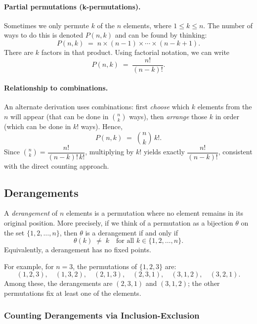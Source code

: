 \documentclass{article}
\begin{document}
\paragraph{Partial permutations (k-permutations).}
Sometimes we only permute $k$ of the $n$ elements, where $1 \le k \le n$. The number of ways to do this is denoted $P(n,k)$ and can be found by thinking:
\[
P(n,k) \;=\; n \times (n-1) \times \cdots \times (n-k+1).
\]
There are $k$ factors in that product. Using factorial notation, we can write
\[
P(n,k) \;=\; \frac{n!}{(n-k)!}.
\]

\paragraph{Relationship to combinations.}
An alternate derivation uses combinations: first \emph{choose} which $k$ elements from the $n$ will appear (that can be done in $\binom{n}{k}$ ways), then \emph{arrange} those $k$ in order (which can be done in $k!$ ways). Hence,
\[
P(n,k) \;=\; \binom{n}{k} \, k!.
\]
Since $\binom{n}{k} = \dfrac{n!}{(n-k)!\,k!}$, multiplying by $k!$ yields exactly $\dfrac{n!}{(n-k)!}$, consistent with the direct counting approach.

\subsection{Derangements}

A \emph{derangement} of $n$ elements is a permutation where no element remains in its original position. More precisely, if we think of a permutation as a bijection $\theta$ on the set $\{1,2,\ldots,n\}$, then $\theta$ is a derangement if and only if 
\[
\theta(k) \;\neq\; k \quad \text{for all } k \in \{1,2,\dots,n\}.
\]
Equivalently, a derangement has no fixed points.

For example, for $n=3$, the permutations of $\{1,2,3\}$ are:
\[
(1,2,3), \quad (1,3,2), \quad (2,1,3), \quad (2,3,1), \quad (3,1,2), \quad (3,2,1).
\]
Among these, the derangements are $(2,3,1)$ and $(3,1,2)$; the other permutations fix at least one of the elements.

\subsubsection*{Counting Derangements via Inclusion-Exclusion}
\end{document}
